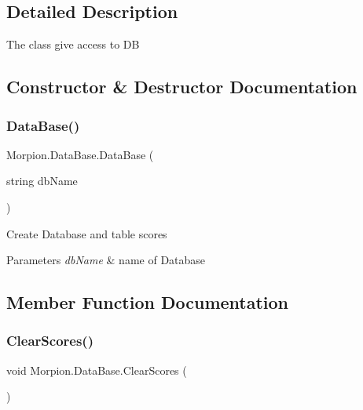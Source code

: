 \subsection{Detailed Description}
The class give access to DB 



\subsection{Constructor \& Destructor Documentation}
\mbox{\label{class_morpion_1_1_data_base_a0d69b39dbf424f7d4105df7a3ec0a586}} 
\subsubsection{\texorpdfstring{Data\+Base()}{DataBase()}}
{\footnotesize\ttfamily Morpion.\+Data\+Base.\+Data\+Base (\begin{DoxyParamCaption}\item[{string}]{db\+Name }\end{DoxyParamCaption})}



Create Database and table scores 


\begin{DoxyParams}{Parameters}
{\em db\+Name} & name of Database\\
\hline
\end{DoxyParams}


\subsection{Member Function Documentation}
\mbox{\label{class_morpion_1_1_data_base_a08b6bf1e688f66fbde3e818e08503be6}} 
\subsubsection{\texorpdfstring{Clear\+Scores()}{ClearScores()}}
{\footnotesize\ttfamily void Morpion.\+Data\+Base.\+Clear\+Scores (\begin{DoxyParamCaption}{ }\end{DoxyParamCaption})}



